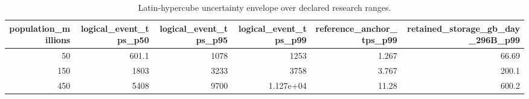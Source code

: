 \begin{table}[t]
\centering
\small
\caption{Latin-hypercube uncertainty envelope over declared research ranges.}
\label{tab:uncertainty}
\begin{tabular}{rrrrrr}
\toprule
population\_millions & logical\_event\_tps\_p50 & logical\_event\_tps\_p95 & logical\_event\_tps\_p99 & reference\_anchor\_tps\_p99 & retained\_storage\_gb\_day\_296B\_p99 \\
\midrule
50 & 601.1 & 1078 & 1253 & 1.267 & 66.69 \\
150 & 1803 & 3233 & 3758 & 3.767 & 200.1 \\
450 & 5408 & 9700 & 1.127e+04 & 11.28 & 600.2 \\
\bottomrule
\end{tabular}
\end{table}
